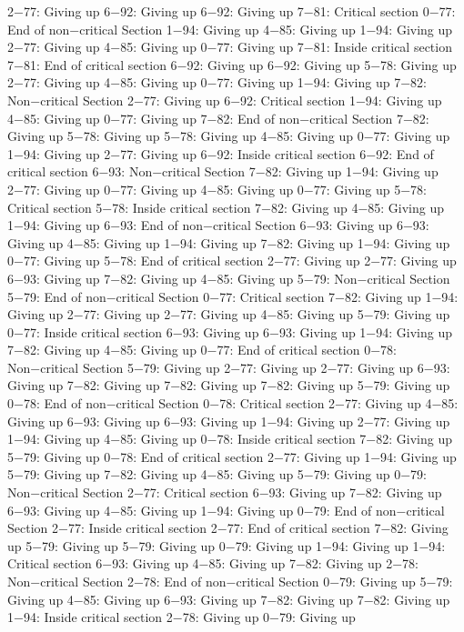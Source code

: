 2−77: Giving up
6−92: Giving up
6−92: Giving up
7−81: Critical section
0−77: End of non−critical Section
1−94: Giving up
4−85: Giving up
1−94: Giving up
2−77: Giving up
4−85: Giving up
0−77: Giving up
7−81: Inside critical section
7−81: End of critical section
6−92: Giving up
6−92: Giving up
5−78: Giving up
2−77: Giving up
4−85: Giving up
0−77: Giving up
1−94: Giving up
7−82: Non−critical Section
2−77: Giving up
6−92: Critical section
1−94: Giving up
4−85: Giving up
0−77: Giving up
7−82: End of non−critical Section
7−82: Giving up
5−78: Giving up
5−78: Giving up
4−85: Giving up
0−77: Giving up
1−94: Giving up
2−77: Giving up
6−92: Inside critical section
6−92: End of critical section
6−93: Non−critical Section
7−82: Giving up
1−94: Giving up
2−77: Giving up
0−77: Giving up
4−85: Giving up
0−77: Giving up
5−78: Critical section
5−78: Inside critical section
7−82: Giving up
4−85: Giving up
1−94: Giving up
6−93: End of non−critical Section
6−93: Giving up
6−93: Giving up
4−85: Giving up
1−94: Giving up
7−82: Giving up
1−94: Giving up
0−77: Giving up
5−78: End of critical section
2−77: Giving up
2−77: Giving up
6−93: Giving up
7−82: Giving up
4−85: Giving up
5−79: Non−critical Section
5−79: End of non−critical Section
0−77: Critical section
7−82: Giving up
1−94: Giving up
2−77: Giving up
2−77: Giving up
4−85: Giving up
5−79: Giving up
0−77: Inside critical section
6−93: Giving up
6−93: Giving up
1−94: Giving up
7−82: Giving up
4−85: Giving up
0−77: End of critical section
0−78: Non−critical Section
5−79: Giving up
2−77: Giving up
2−77: Giving up
6−93: Giving up
7−82: Giving up
7−82: Giving up
7−82: Giving up
5−79: Giving up
0−78: End of non−critical Section
0−78: Critical section
2−77: Giving up
4−85: Giving up
6−93: Giving up
6−93: Giving up
1−94: Giving up
2−77: Giving up
1−94: Giving up
4−85: Giving up
0−78: Inside critical section
7−82: Giving up
5−79: Giving up
0−78: End of critical section
2−77: Giving up
1−94: Giving up
5−79: Giving up
7−82: Giving up
4−85: Giving up
5−79: Giving up
0−79: Non−critical Section
2−77: Critical section
6−93: Giving up
7−82: Giving up
6−93: Giving up
4−85: Giving up
1−94: Giving up
0−79: End of non−critical Section
2−77: Inside critical section
2−77: End of critical section
7−82: Giving up
5−79: Giving up
5−79: Giving up
0−79: Giving up
1−94: Giving up
1−94: Critical section
6−93: Giving up
4−85: Giving up
7−82: Giving up
2−78: Non−critical Section
2−78: End of non−critical Section
0−79: Giving up
5−79: Giving up
4−85: Giving up
6−93: Giving up
7−82: Giving up
7−82: Giving up
1−94: Inside critical section
2−78: Giving up
0−79: Giving up
